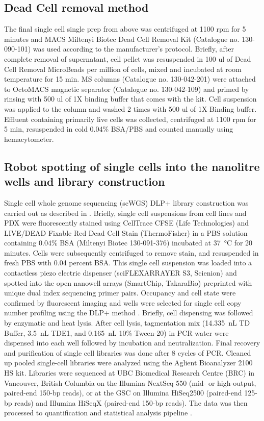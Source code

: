 \subsection{Dead Cell removal method}
The final single cell single prep from above was centrifuged at 1100 rpm for 5 minutes and MACS Miltenyi Biotec Dead Cell Removal Kit (Catalogue no. 130-090-101) was used according to the manufacturer's protocol. Briefly, after complete removal of supernatant, cell pellet was resuspended in 100 ul of
Dead Cell Removal MicroBeads per million of cells, mixed and incubated at room temperature for 15 min. MS columns (Catalogue no. 130-042-201) were attached to OctoMACS magnetic separator (Catalogue no. 130-042-109) and primed by rinsing with 500 ul of 1X binding buffer that comes with the kit. Cell suspension was
applied to the column and washed 2 times with 500 ul of 1X Binding buffer. Effluent containing primarily live cells was collected, centrifuged at 1100 rpm for 5 min, resuspended in cold 0.04\% BSA/PBS and counted manually using hemacytometer.


\subsection{Robot spotting of single cells into the nanolitre wells and library construction}
 Single cell whole genome sequencing (scWGS) DLP+ library construction was carried out as described in \cite{laks2019clonal}. Briefly, single cell suspensions from cell lines and PDX were fluorescently stained using CellTrace CFSE (Life Technologies) and LIVE/DEAD Fixable Red Dead Cell Stain (ThermoFisher) in a PBS solution containing 0.04\% BSA (Miltenyi Biotec 130-091-376) incubated at \SI{37}{\degreeCelsius} for 20 minutes. Cells were subsequently centrifuged to remove stain, and resuspended in fresh PBS with 0.04 percent BSA. This single cell suspension was loaded into a contactless piezo electric dispenser (sciFLEXARRAYER S3, Scienion) and spotted into the open nanowell arrays (SmartChip, TakaraBio) preprinted with unique dual index sequencing primer pairs. Occupancy and cell state were confirmed by fluorescent imaging and wells were selected for single cell copy number profiling using the DLP+ method \cite{laks2019clonal}. Briefly, cell dispensing was followed by enzymatic and heat lysis. After cell lysis, tagmentation mix 
(\SI{14.335}{\nano\liter} TD Buffer, \SI{3.5}{\nano\liter} TDE1, and \SI{0.165}{\nano\liter} 10\% Tween-20) in PCR water were dispensed into each well followed by incubation and neutralization. Final recovery and purification of single cell libraries was done after 8 cycles of PCR. Cleaned up pooled single-cell libraries were analyzed using the Aglient Bioanalyzer 2100 HS kit. Libraries were sequenced at UBC Biomedical Research Centre (BRC) in Vancouver, British Columbia on the Illumina NextSeq 550 (mid- or high-output, paired-end 150-bp reads), or at the GSC on Illumina HiSeq2500 (paired-end 125-bp reads) and Illumina HiSeqX (paired-end 150-bp reads). The data was then processed to quantification and statistical analysis pipeline \cite{laks2019clonal}.

